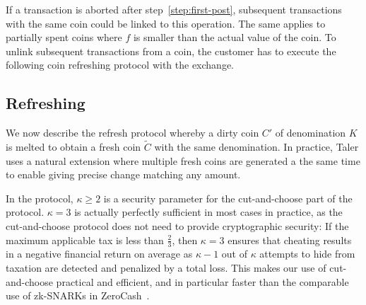 \documentclass{llncs}
\begin{document}
If a transaction is aborted after step~\ref{step:first-post}, subsequent
transactions with the same coin could be linked to this operation.
The same applies to partially spent coins where $f$ is smaller than
the actual value of the coin.  To unlink subsequent transactions from
a coin, the customer has to execute the following coin refreshing
protocol with the exchange.

%
%
%


\subsection{Refreshing} \label{sec:refreshing}

We now describe the refresh protocol whereby a dirty coin $C'$ of
denomination $K$ is melted to obtain a fresh coin $\widetilde{C}$
with the same denomination.  In practice, Taler uses a natural
extension where multiple fresh coins are generated a the same time to
enable giving precise change matching any amount.

In the protocol, $\kappa \ge 2$ is a security parameter for the
cut-and-choose part of the protocol.  $\kappa = 3$ is actually
perfectly sufficient in most cases in practice, as the cut-and-choose
protocol does not need to provide cryptographic security: If the
maximum applicable tax is less than $\frac{2}{3}$, then $\kappa = 3$
ensures that cheating results in a negative financial return on
average as $\kappa - 1$ out of $\kappa$ attempts to hide from taxation
are detected and penalized by a total loss.  This makes our use of
cut-and-choose practical and efficient, and in particular faster
than the comparable use of zk-SNARKs in ZeroCash~\cite{zerocash}.
\end{document}
